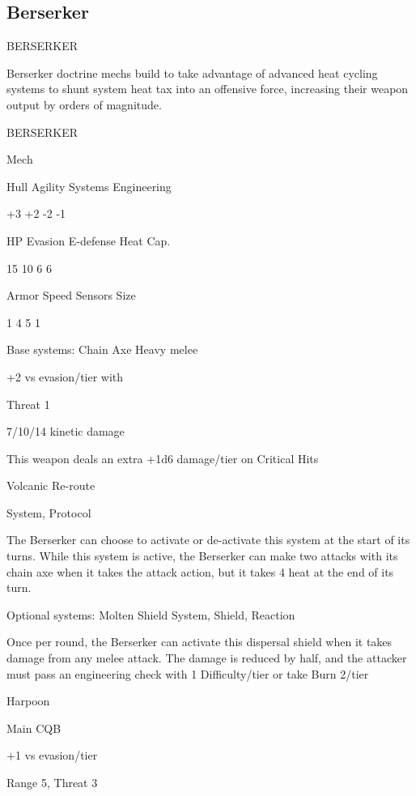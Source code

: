 \subsection{Berserker}
                                            BERSERKER

Berserker doctrine mechs build to take advantage of advanced heat cycling systems to shunt
system heat tax into an offensive force, increasing their weapon output by orders of magnitude.

       BERSERKER

       Mech

       Hull      Agility      Systems       Engineering

       +3         +2          -2            -1

       HP         Evasion     E-defense     Heat Cap.

       15         10          6             6

       Armor     Speed        Sensors       Size

       1          4           5             1

Base systems:
Chain Axe
Heavy melee

+2 vs evasion/tier with

Threat 1

7/10/14 kinetic damage

This weapon deals an extra +1d6 damage/tier on Critical Hits


Volcanic Re-route

System, Protocol

The Berserker can choose to activate or de-activate this system at the start of its turns. While
this system is active, the Berserker can make two attacks with its chain axe when it takes the
attack action, but it takes 4 heat at the end of its turn.


Optional systems:
Molten Shield
System, Shield, Reaction

Once per round, the Berserker can activate this dispersal shield when it takes damage from any
melee attack. The damage is reduced by half, and the attacker must pass an engineering check
with 1 Difficulty/tier or take Burn 2/tier


Harpoon

Main CQB

+1 vs evasion/tier





Range 5, Threat 3

